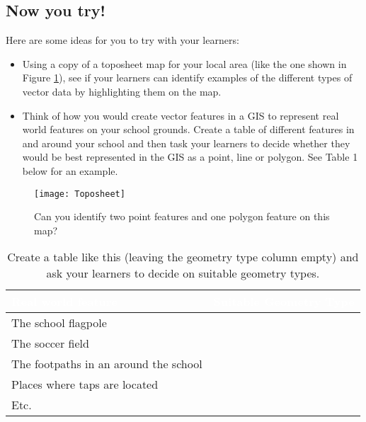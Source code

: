 \subsection{Now you try!}

Here are some ideas for you to try with your learners:

\begin{itemize}
\item Using a copy of a toposheet map for your local area (like the one shown
in Figure \ref{fig:toposheet}), see if your learners can identify examples of
the different types of vector data by highlighting them on the map.
\item Think of how you would create vector features in a GIS to represent real
world features on your school grounds. Create a table of different features
in and around your school and then task your learners to decide whether they
would be best represented in the GIS as a point, line or polygon. See Table 1
below for an example.
\end{itemize}

\begin{figure}[ht]
   \begin{center}
   \caption{Can you identify two point features and one polygon feature on
    this map?}
    \label{fig:toposheet}\smallskip
   \texttt{[image: Toposheet]}
\end{center}
\end{figure}

\begin{table}[ht]
\centering
\caption{Create a table like this (leaving the geometry type column empty)
and ask your learners to decide on suitable geometry types.}\medskip
 \label{tab:places}
 \begin{tabular}{|p{8cm}|p{8cm}|}
 \hline
 \rowcolor{black}
 \textcolor{white}{\textbf{Real world feature}} &
 \textcolor{white}{\textbf{Suitable Geometry Type}} \\
 \hline The school flagpole & \\
 \hline The soccer field & \\
 \hline The footpaths in an around the school & \\
 \hline Places where taps are located & \\
 \hline Etc. & \\
\hline
\end{tabular}
\end{table}

